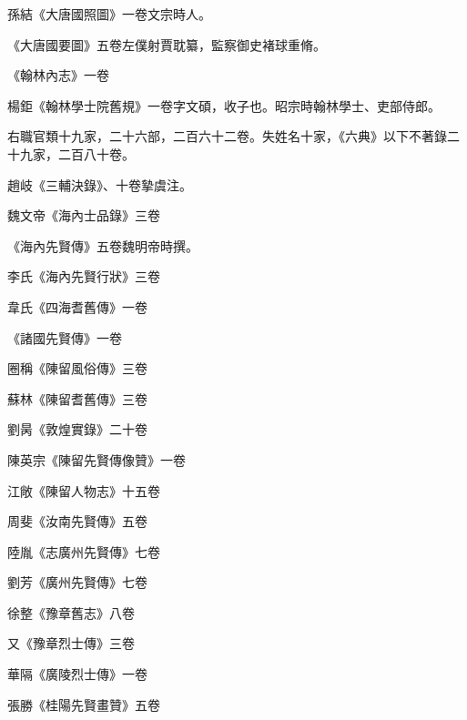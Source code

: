 \begin{pinyinscope}
 孫結《大唐國照圖》一卷文宗時人。



 《大唐國要圖》五卷左僕射賈耽纂，監察御史褚球重脩。



 《翰林內志》一卷



 楊鉅《翰林學士院舊規》一卷字文碩，收子也。昭宗時翰林學士、吏部侍郎。



 右職官類十九家，二十六部，二百六十二卷。失姓名十家，《六典》以下不著錄二十九家，二百八十卷。



 趙岐《三輔決錄》、十卷摯虞注。



 魏文帝《海內士品錄》三卷



 《海內先賢傳》五卷魏明帝時撰。



 李氏《海內先賢行狀》三卷



 韋氏《四海耆舊傳》一卷



 《諸國先賢傳》一卷



 圈稱《陳留風俗傳》三卷



 蘇林《陳留耆舊傳》三卷



 劉昺《敦煌實錄》二十卷



 陳英宗《陳留先賢傳像贊》一卷



 江敞《陳留人物志》十五卷



 周斐《汝南先賢傳》五卷



 陸胤《志廣州先賢傳》七卷



 劉芳《廣州先賢傳》七卷



 徐整《豫章舊志》八卷



 又《豫章烈士傳》三卷



 華隔《廣陵烈士傳》一卷



 張勝《桂陽先賢畫贊》五卷




\end{pinyinscope}
